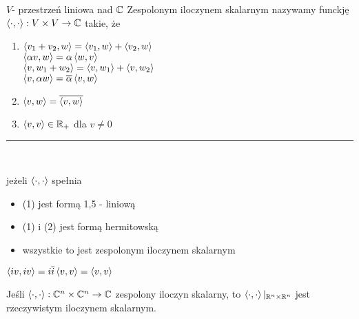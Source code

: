 \begin{df} 
    $V $- przestrzeń liniowa nad $\mathbb{C}$ 
    Zespolonym iloczynem skalarnym nazywamy funckję $\left\langle \cdot, \cdot \right\rangle : V \times V 
    \to \mathbb{C}$ takie, że 
    \begin{enumerate}[(1)] 
        \item $\left\langle v_1+v_2, w \right\rangle = \left\langle v_1, w \right\rangle + \left\langle v_2, w \right\rangle$ \\ 
            $\left\langle \alpha v, w \right\rangle = \alpha\left\langle w, v \right\rangle$ \\ 
            $\left\langle v, w_1+w_2 \right\rangle = \left\langle v, w_1 \right\rangle+\left\langle v, w_2 \right\rangle$ \\ 
            $\left\langle v, \alpha w \right\rangle = \overline{\alpha} \left\langle v, w \right\rangle$ 
        \item $\left\langle v, w \right\rangle = \overline{\left\langle v, w \right\rangle}$ 
        \item $\left\langle v, v \right\rangle \in \mathbb{R}_+$ dla $v \neq 0$
    \end{enumerate} 
    \rule{3cm}{0.4pt} \\ 
    \footnotesize
    { 
        jeżeli $\left\langle \cdot, \cdot \right\rangle$ spełnia
        \begin{itemize} 
            \item (1) jest formą 1,5 - liniową 
            \item (1) i (2) jest formą hermitowską 
            \item wszystkie to jest zespolonym iloczynem skalarnym
        \end{itemize} 
    } 
\end{df} 
$\left\langle iv, iv \right\rangle = i\overline{i}\left\langle v, v \right\rangle = \left\langle v, v \right\rangle$
\begin{uw} 
    Jeśli $\left\langle \cdot, \cdot \right\rangle: \mathbb{C}^n \times \mathbb{C}^n \to \mathbb{C}$ zespolony iloczyn skalarny, to 
    $ \left\langle \cdot, \cdot \right\rangle |_{\mathbb{R}^n \times \mathbb{R}^n}$ jest rzeczywistym iloczynem skalarnym. 
\end{uw} 
